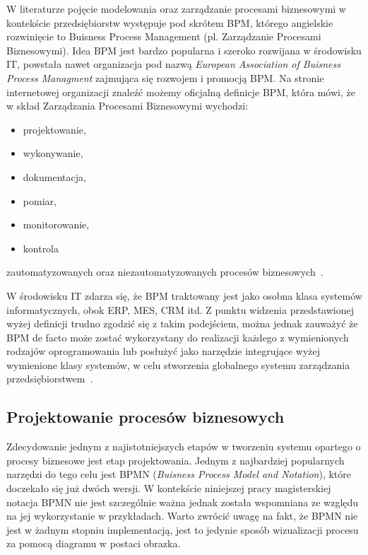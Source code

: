 W literaturze pojęcie modelowania oraz zarządzanie procesami biznesowymi w kontekście przedsiębiorstw występuje pod skrótem BPM, którego angielskie rozwinięcie to Buisness Process Management (pl.  Zarządzanie Procesami Biznesowymi). Idea BPM jest bardzo popularna i szeroko rozwijana w środowisku IT, powstała nawet organizacja pod nazwą \textit{European Association of Buisness Process Managment} zajmująca się rozwojem i promocją BPM.  Na stronie internetowej organizacji znaleźć możemy oficjalną definicje BPM, która mówi, że w skład Zarządzania Procesami Biznesowymi wychodzi:
\begin{itemize}
\item projektowanie,
\item wykonywanie,
\item dokumentacja,
\item pomiar,
\item monitorowanie,
\item kontrola
\end{itemize}
zautomatyzowanych oraz niezautomatyzowanych procesów biznesowych~\cite{EAOBPMWeb}.

W środowisku IT zdarza się, że BPM traktowany jest jako osobna klasa systemów informatycznych, obok ERP, MES, CRM itd. Z punktu widzenia przedstawionej wyżej definicji trudno zgodzić się z takim podejściem, można jednak zauważyć że BPM de facto może zostać wykorzystany do realizacji każdego z wymienionych rodzajów oprogramowania lub posłużyć jako narzędzie integrujące wyżej wymienione klasy systemów, w celu stworzenia globalnego systemu zarządzania przedsiębiorstwem~\cite{wiBPMA}.

\subsection{Projektowanie procesów biznesowych}
\label{sec:projektowanieBPM}

Zdecydowanie jednym z najistotniejszych etapów w tworzeniu systemu opartego o procesy biznesowe jest etap projektowania. Jednym z najbardziej popularnych narzędzi do tego celu jest BPMN (\textit{Buisness Process Model and Notation}), które doczekało się już dwóch wersji. W kontekście niniejszej pracy magisterskiej notacja BPMN nie jest szczególnie ważna jednak została wspomniana ze względu na jej wykorzystanie w przykładach. Warto zwrócić uwagę  na fakt, że BPMN nie jest w żadnym stopniu implementacją, jest to jedynie sposób wizualizacji procesu za pomocą diagramu w postaci obrazka.


